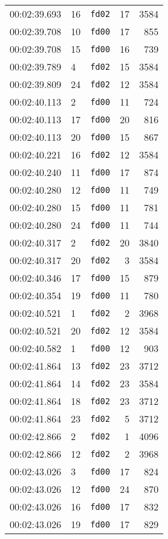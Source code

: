 \documentclass{article}
\begin{document}
\begin{longtable}{lllrr}
00:02:39.693 & 16 & \texttt{fd02} & 17 & 3584 \\
00:02:39.708 & 10 & \texttt{fd00} & 17 & 855 \\
00:02:39.708 & 15 & \texttt{fd00} & 16 & 739 \\
00:02:39.789 & 4 & \texttt{fd02} & 15 & 3584 \\
00:02:39.809 & 24 & \texttt{fd02} & 12 & 3584 \\
00:02:40.113 & 2 & \texttt{fd00} & 11 & 724 \\
00:02:40.113 & 17 & \texttt{fd00} & 20 & 816 \\
00:02:40.113 & 20 & \texttt{fd00} & 15 & 867 \\
00:02:40.221 & 16 & \texttt{fd02} & 12 & 3584 \\
00:02:40.240 & 11 & \texttt{fd00} & 17 & 874 \\
00:02:40.280 & 12 & \texttt{fd00} & 11 & 749 \\
00:02:40.280 & 15 & \texttt{fd00} & 11 & 781 \\
00:02:40.280 & 24 & \texttt{fd00} & 11 & 744 \\
00:02:40.317 & 2 & \texttt{fd02} & 20 & 3840 \\
00:02:40.317 & 20 & \texttt{fd02} & 3 & 3584 \\
00:02:40.346 & 17 & \texttt{fd00} & 15 & 879 \\
00:02:40.354 & 19 & \texttt{fd00} & 11 & 780 \\
00:02:40.521 & 1 & \texttt{fd02} & 2 & 3968 \\
00:02:40.521 & 20 & \texttt{fd02} & 12 & 3584 \\
00:02:40.582 & 1 & \texttt{fd00} & 12 & 903 \\
00:02:41.864 & 13 & \texttt{fd02} & 23 & 3712 \\
00:02:41.864 & 14 & \texttt{fd02} & 23 & 3584 \\
00:02:41.864 & 18 & \texttt{fd02} & 23 & 3712 \\
00:02:41.864 & 23 & \texttt{fd02} & 5 & 3712 \\
00:02:42.866 & 2 & \texttt{fd02} & 1 & 4096 \\
00:02:42.866 & 12 & \texttt{fd02} & 2 & 3968 \\
00:02:43.026 & 3 & \texttt{fd00} & 17 & 824 \\
00:02:43.026 & 12 & \texttt{fd00} & 24 & 870 \\
00:02:43.026 & 16 & \texttt{fd00} & 17 & 832 \\
00:02:43.026 & 19 & \texttt{fd00} & 17 & 829 \\

\end{longtable}
\end{document}

